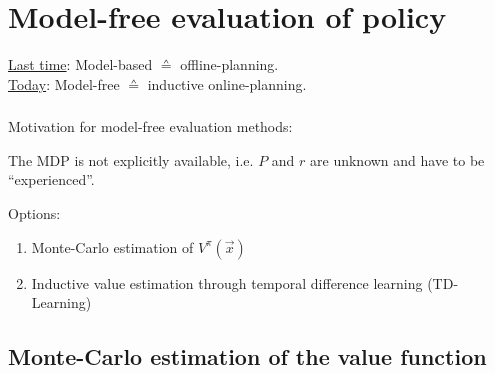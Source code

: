 \section{Model-free evaluation of policy}

\newcommand{\lr}{\eta}

\begin{frame} 
    \begin{center}
    \underline{Last time}: Model-based $\corresponds$ offline-planning.\\
    \underline{Today}: Model-free $\corresponds$ inductive online-planning.\\
    \end{center}
\end{frame}

\begin{frame}\frametitle{\secname}

Motivation for model-free evaluation methods:

The MDP is not explicitly available, i.e. $P$ and $r$ are unknown and have to be ``experienced''.

Options:
\begin{enumerate}[A]
\item Monte-Carlo estimation of $V^\pi(\vec x)$
\item Inductive value estimation through temporal difference learning (TD-Learning)
\end{enumerate}

\end{frame}

\subsection{Monte-Carlo estimation of the value function}

